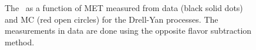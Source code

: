 \begin{figure}[!hbtp]
\centering
{}
\caption{
 The \routin\, as a function of MET measured from data (black solid dots) 
and MC (red open circles) for the Drell-Yan processes. The measurements 
in data are done using the opposite flavor subtraction method. }
\label{fig:dyr_ww}
\end{figure}
